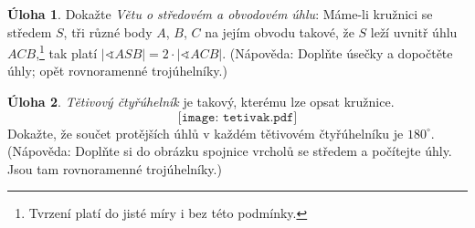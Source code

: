 \documentclass[10pt,a5paper]{extarticle}
\newcommand{\hint}[1]{{\color{gray}\footnotesize\noindent(Nápověda: #1)}}
\theoremstyle{definition}
\newtheorem{uloha}{\atr Úloha}
\def\atr{}
\def\interest{\def\atr{\llap{$\star$ }\gdef\atr{}}}
\begin{document}
\interest
\begin{uloha}
Dokažte \emph{Větu o středovém a obvodovém úhlu}: Máme-li kružnici se středem $S$, tři různé body $A$, $B$, $C$ na jejím obvodu takové, že $S$ leží uvnitř úhlu $ACB$,\footnote{Tvrzení platí do jisté míry i bez této podmínky.} tak platí $|\sphericalangle ASB| = 2 \cdot |\sphericalangle ACB|$. \hint{Doplňte úsečky a dopočtěte úhly; opět rovnoramenné trojúhelníky.}
\end{uloha}


\interest
\begin{uloha}
\emph{Tětivový čtyřúhelník} je takový, kterému lze opsat kružnice.
\[ \texttt{[image: tetivak.pdf]} \]
Dokažte, že součet protějších úhlů v každém tětivovém čtyřúhelníku je $180^\circ$.
\hint{Doplňte si do obrázku spojnice vrcholů se středem a počítejte úhly. Jsou tam rovnoramenné trojúhelníky.}
\end{uloha}
\end{document}
